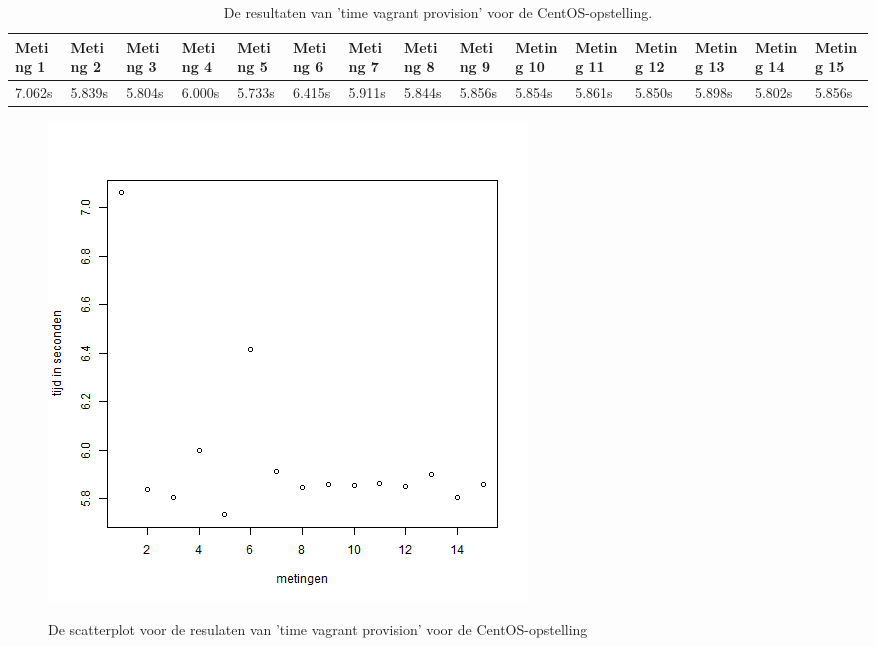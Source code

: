 \begin{table}
	\centering
	\begin{tabular}{lllllllllllllll}
		\hline
		Meting 1 & Meting 2 & Meting 3 & Meting 4 & Meting 5 & Meting 6 & Meting 7 & Meting 8 & Meting 9 & Meting 10 & Meting 11 & Meting 12 & Meting 13 & Meting 14 & Meting 15 \\
		\hline
		7.062s & 5.839s & 5.804s & 6.000s & 5.733s & 6.415s & 5.911s & 5.844s & 5.856s & 5.854s & 5.861s & 5.850s & 5.898s & 5.802s & 5.856s \\
		\hline
	\end{tabular}
	\caption{De resultaten van 'time vagrant provision' voor de CentOS-opstelling.}
	\label{tab:timevagrantprovisioncentos}
\end{table}

\begin{figure}
	\centering
	\caption{De scatterplot voor de resulaten van 'time vagrant provision' voor de CentOS-opstelling}
	\includegraphics[scale=0.5]{img/centosplotprovision.png}
	\label{fig:centosprovisionplot}
\end{figure}

